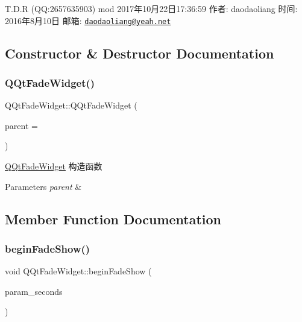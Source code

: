 T.\+D.\+R (QQ\+:2657635903) mod 2017年10月22日17\+:36\+:59 作者\+: daodaoliang 时间\+: 2016年8月10日 邮箱\+: \href{mailto:daodaoliang@yeah.net}{\tt daodaoliang@yeah.\+net} 

\subsection{Constructor \& Destructor Documentation}
\mbox{\label{class_q_qt_fade_widget_a4ff66449736c51e0cac964b7cf39cb9d}} 
\subsubsection{\texorpdfstring{Q\+Qt\+Fade\+Widget()}{QQtFadeWidget()}}
{\footnotesize\ttfamily Q\+Qt\+Fade\+Widget\+::\+Q\+Qt\+Fade\+Widget (\begin{DoxyParamCaption}\item[{Q\+Widget $\ast$}]{parent = {} }\end{DoxyParamCaption})\hspace{0.3cm}{\ttfamily [explicit]}}



\mbox{\hyperlink{class_q_qt_fade_widget}{Q\+Qt\+Fade\+Widget}} 构造函数 


\begin{DoxyParams}{Parameters}
{\em parent} & \\
\hline
\end{DoxyParams}


\subsection{Member Function Documentation}
\mbox{\label{class_q_qt_fade_widget_a6b0c7bfb2ecb67b493570c723f141876}} 
\subsubsection{\texorpdfstring{begin\+Fade\+Show()}{beginFadeShow()}}
{\footnotesize\ttfamily void Q\+Qt\+Fade\+Widget\+::begin\+Fade\+Show (\begin{DoxyParamCaption}\item[{quint32}]{param\+\_\+seconds }\end{DoxyParamCaption})}



